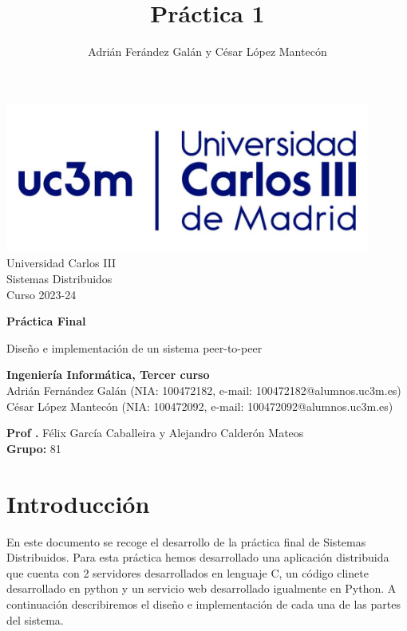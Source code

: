 \documentclass[]{article}
\title{Práctica 1}
\author{Adrián Ferández Galán y César López Mantecón}
\begin{document}
\begin{titlepage}
    \centering
   \includegraphics[width=0.9\textwidth]{uc3m.jpg} 
    {\Huge Universidad Carlos III\\
    
     \Large Sistemas Distribuidos\\
     \vspace{0.5cm}
     Curso 2023-24}
    \vspace{2cm}

    {\Huge \textbf{Práctica Final} \par}
    \vspace{0.5cm}
    {\Large Diseño e implementación de un sistema peer-to-peer \par}
    \vspace{8cm}

   \textbf{Ingeniería Informática, Tercer curso}\\
    \vspace{0.2cm} 
    Adrián Fernández Galán (NIA: 100472182, e-mail: 100472182@alumnos.uc3m.es) \\
    César López Mantecón   (NIA: 100472092, e-mail: 100472092@alumnos.uc3m.es)
    \vspace{0.5cm}

   
    \textbf{Prof .} Félix García Caballeira y Alejandro Calderón Mateos\\
    
    \textbf{Grupo: } 81   
    
\end{titlepage}
\newpage

\renewcommand{\contentsname}{\centering Índice}
\tableofcontents

\newpage

\section{Introducción}
\label{sec:introduccion}
En este documento se recoge el desarrollo de la práctica final de Sistemas Distribuidos. Para esta práctica hemos desarrollado una aplicación distribuida que cuenta con 2 servidores desarrollados en lenguaje C, un código clinete desarrollado en python y un servicio web desarrollado igualmente en Python. A continuación describiremos el diseño e implementación de cada una de las partes del sistema. 
\end{document}
